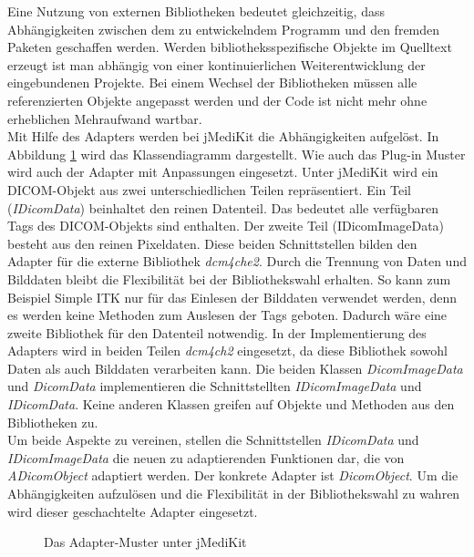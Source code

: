 Eine Nutzung von externen Bibliotheken bedeutet gleichzeitig, dass Abhängigkeiten zwischen dem zu entwickelndem Programm und den fremden Paketen geschaffen werden. Werden bibliotheksspezifische Objekte im Quelltext erzeugt ist man abhängig von einer kontinuierlichen Weiterentwicklung der eingebundenen Projekte. Bei einem Wechsel der Bibliotheken müssen alle referenzierten Objekte angepasst werden und der Code ist nicht mehr ohne erheblichen Mehraufwand wartbar.\\
Mit Hilfe des Adapters werden bei jMediKit die Abhängigkeiten aufgelöst. In Abbildung \ref{dicomo} wird das Klassendiagramm dargestellt. Wie auch das Plug-in Muster wird auch der Adapter mit Anpassungen eingesetzt. Unter jMediKit wird ein DICOM-Objekt aus zwei unterschiedlichen Teilen repräsentiert. Ein Teil (\textit{IDicomData}) beinhaltet den reinen Datenteil. Das bedeutet alle verfügbaren Tags des DICOM-Objekts sind enthalten. Der zweite Teil (IDicomImageData) besteht aus den reinen Pixeldaten. Diese beiden Schnittstellen bilden den Adapter für die externe Bibliothek \textit{dcm4che2}. Durch die Trennung von Daten und Bilddaten bleibt die Flexibilität bei der Bibliothekswahl erhalten. So kann zum Beispiel Simple ITK nur für das Einlesen der Bilddaten verwendet werden, denn es werden keine Methoden zum Auslesen der Tags geboten. Dadurch wäre eine zweite Bibliothek für den Datenteil notwendig. In der Implementierung des Adapters wird in beiden Teilen \textit{dcm4ch2} eingesetzt, da diese Bibliothek sowohl Daten als auch Bilddaten verarbeiten kann. Die beiden Klassen \textit{DicomImageData} und \textit{DicomData} implementieren die Schnittstellten \textit{IDicomImageData} und \textit{IDicomData}. Keine anderen Klassen greifen auf Objekte und Methoden aus den Bibliotheken zu.\\
Um beide Aspekte zu vereinen, stellen die Schnittstellen \textit{IDicomData} und \textit{IDicomImageData} die neuen zu adaptierenden Funktionen dar, die von \textit{ADicomObject} adaptiert werden. Der konkrete Adapter ist \textit{DicomObject}. Um die Abhängigkeiten aufzulösen und die Flexibilität in der Bibliothekswahl zu wahren wird dieser geschachtelte Adapter eingesetzt.

\begin{figure}[htbp]
  \vspace{0.5cm}
  \centering
  \caption{Das Adapter-Muster unter jMediKit}
  \label{dicomo}
  \vspace{0.5cm}
\end{figure}

